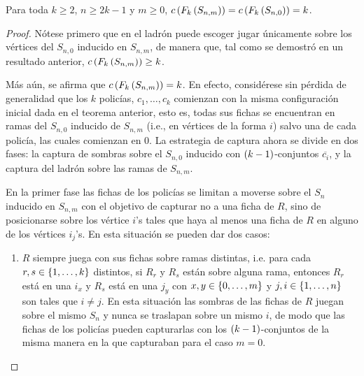 \begin{teorema}
\label{teo:numero-de-policia-estrella-subdivisiones}
    Para toda $k\geq 2$, $n\geq 2k-1$ y $m\geq 0$,
    $c\left( F_{k}\left( S_{n,m}\right)\right)=c\left( F_{k}\left( S_{n,0}\right)\right)=k$.
\end{teorema}
\begin{proof}
    N\'otese primero que en  el ladr\'on puede escoger jugar \'unicamente sobre
    los v\'ertices del $S_{n,0}$ inducido en $S_{n,m}$, de manera que, tal como
    se demostr\'o en un resultado anterior, $c\left( F_{k}\left( S_{n,m}\right)\right)\geq k$.

    M\'as a\'un, se afirma que $c\left( F_{k}\left( S_{n,m}\right)\right) = k$. En efecto,
    consid\'erese sin p\'erdida de generalidad que los $k$ polic\'ias,
    $c_1,\dots, c_k$ comienzan con la misma configuraci\'on inicial dada en el
    teorema anterior, esto es, todas sus fichas se encuentran en ramas del
    $S_{n,0}$ inducido de $S_{n,m}$ (i.e., en v\'ertices de la forma $i$) salvo
    una de cada polic\'ia, las cuales comienzan en $0$. La estrategia de captura
    ahora se divide en dos fases: la captura de sombras sobre el $S_{n,0}$
    inducido con $\left( k-1\right)$-conjuntos $\overline{c_i}$, y la captura del
    ladr\'on sobre las ramas de $S_{n,m}$.

    En la primer fase las fichas de los polic\'ias se limitan a moverse sobre el
    $S_n$ inducido en $S_{n,m}$ con el objetivo de capturar no a una ficha de
    $R$, sino de posicionarse sobre los v\'ertice $i$'s tales que haya al menos
    una ficha de $R$ en alguno de los v\'ertices $i_j$'s. En esta situaci\'on se
    pueden dar dos casos:
        \begin{enumerate}
            \item $R$ siempre juega con sus fichas sobre ramas distintas, i.e.
            para cada $r,s\in \{1,\dots, k\}$ distintos, si $R_r$ y $R_s$ est\'an
            sobre alguna rama, entonces $R_r$ est\'a en una $i_{x}$ y $R_s$
            est\'a en una $j_{y}$ con $x,y\in \{0,\dots, m\}$ y $j,i\in \{1,\dots, n\}$
            son tales que $i\neq j$. En esta situaci\'on las sombras de las
            fichas de $R$ juegan sobre el mismo $S_n$ y nunca se traslapan sobre
            un mismo $i$, de modo que las fichas de los polic\'ias pueden
            capturarlas con los $\left( k-1\right)$-conjuntos de la misma manera en la
            que capturaban para el caso $m=0$.
            

\end{enumerate}
\end{proof}
